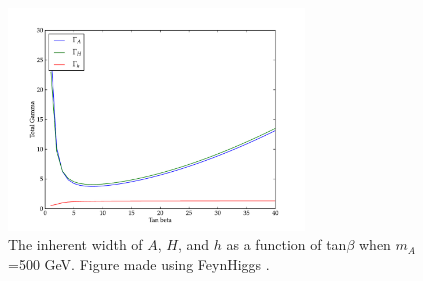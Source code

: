 \begin{figure}
	\centering
	\includegraphics[width=0.7\textwidth]{Theory/figures/TB_gamma.pdf}
	\caption{The inherent width of $A$, $H$, and $h$ as a function of tan$\beta$ when $m_A$=500 GeV. 
    Figure made using FeynHiggs \cite{feynhiggs_1, feynhiggs_2, feynhiggs_3, feynhiggs_4, feynhiggs_5}. \label{fig:TB_width}}
\end{figure}





